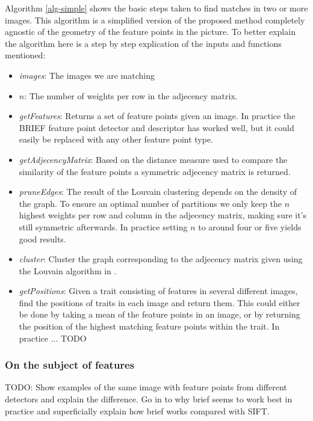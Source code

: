 \documentclass{article}
\begin{document}
Algorithm \ref{alg-simple} shows the basic steps taken to find matches 
in two or more images. This algorithm is a simplified version of the 
proposed method completely agnostic of the geometry of the feature 
points in the picture. To better explain the algorithm here is a step by 
step explication of the inputs and functions mentioned:
\begin{itemize}
\item[]{\emph{images}: The images we are matching}
\item[]{\emph{$n$}: The number of weights per row in the adjecency 
matrix.}
\item[]{\emph{getFeatures}: Returns a set of feature points given an 
image. In practice the BRIEF\cite{calonder2010brief} feature point 
detector and descriptor has worked well, but it could easily be replaced 
with any other feature point type.} 
\item[]{\emph{getAdjecencyMatrix}: Based on the distance measure used to 
compare the similarity of the feature points a symmetric adjecency 
matrix is returned.}
\item[]{\emph{pruneEdges}: The result of the Louvain clustering depends 
on the density of the graph. To ensure an optimal number of partitions 
we only keep the $n$ highest weights per row and column in the adjecency 
matrix, making sure it's still symmetric afterwards. In practice setting 
$n$ to around four or five yields good results.}
\item[]{\emph{cluster}: Cluster the graph corresponding to the adjecency 
matrix given using the Louvain algorithm in \cite{blondel2008}.}
\item[]{\emph{getPositions}: Given a trait consisting of features in 
several different images, find the positions of traits in each image and 
return them. This could either be done by taking a mean of the feature 
points in an image, or by returning the position of the highest matching 
feature points within the trait. In practice ... TODO}
\end{itemize}

\subsubsection{On the subject of features}

TODO: Show examples of the same image with feature points from different 
detectors and explain the difference. Go in to why brief seems to work 
best in practice and superficially explain how brief works compared with 
SIFT. 
\end{document}

